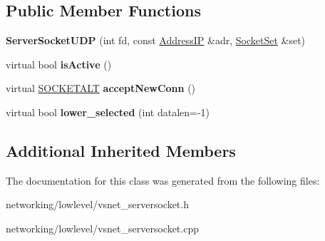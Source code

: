 \subsection*{Public Member Functions}
\begin{DoxyCompactItemize}
\item 
{\bfseries Server\+Socket\+U\+DP} (int fd, const \hyperlink{structAddressIP}{Address\+IP} \&adr, \hyperlink{classSocketSet}{Socket\+Set} \&set)\hypertarget{classServerSocketUDP_a7a1582992da9e41071762cf08d8bf1d5}{}\label{classServerSocketUDP_a7a1582992da9e41071762cf08d8bf1d5}

\item 
virtual bool {\bfseries is\+Active} ()\hypertarget{classServerSocketUDP_ae1a4dc8d566d5d9142acd13c2a671048}{}\label{classServerSocketUDP_ae1a4dc8d566d5d9142acd13c2a671048}

\item 
virtual \hyperlink{classSOCKETALT}{S\+O\+C\+K\+E\+T\+A\+LT} {\bfseries accept\+New\+Conn} ()\hypertarget{classServerSocketUDP_a0a8d1a6efa95704ac3f9ebba5e672c71}{}\label{classServerSocketUDP_a0a8d1a6efa95704ac3f9ebba5e672c71}

\item 
virtual bool {\bfseries lower\+\_\+selected} (int datalen=-\/1)\hypertarget{classServerSocketUDP_a5f37ff71c73e914361ae40aea03e4f10}{}\label{classServerSocketUDP_a5f37ff71c73e914361ae40aea03e4f10}

\end{DoxyCompactItemize}
\subsection*{Additional Inherited Members}


The documentation for this class was generated from the following files\+:\begin{DoxyCompactItemize}
\item 
networking/lowlevel/vsnet\+\_\+serversocket.\+h\item 
networking/lowlevel/vsnet\+\_\+serversocket.\+cpp\end{DoxyCompactItemize}
